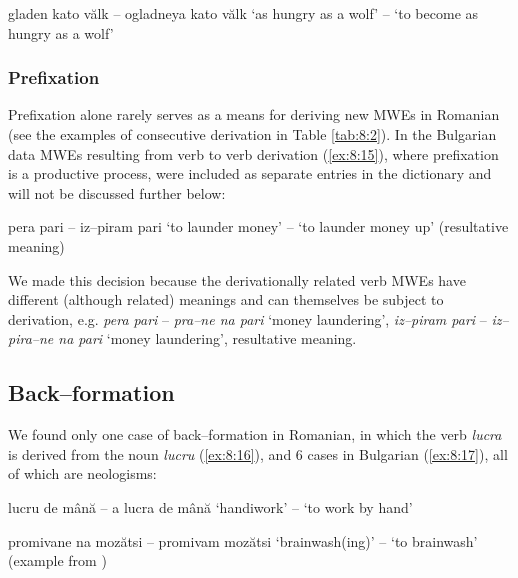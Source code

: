 \documentclass[output=paper]{langsci/langscibook}
\begin{document}
\begin{exe}
\ex \label{ex:8:14}
\settowidth{}
gladen kato vălk – ogladneya kato vălk 
 ‘as hungry as a wolf’ – ‘to become as hungry as a wolf’
\end{exe}

\subsubsection{Prefixation}
\label{prefixation}

Prefixation alone rarely serves as a means for deriving new MWEs in
Romanian (see the examples of consecutive derivation in Table \ref{tab:8:2}). In
the Bulgarian data MWEs resulting from verb to verb derivation (\ref{ex:8:15}),
where prefixation is a productive process, were included as separate
entries in the dictionary and will not be discussed further below:

\begin{exe}
\ex \label{ex:8:15}
\settowidth{}
pera pari – iz–piram pari 
‘to launder money’ – ‘to launder money up’ (resultative meaning)
\end{exe}

We made this decision because the derivationally related verb MWEs have
different (although related) meanings and can themselves be subject to
derivation, e.g. \textit{pera pari} – \textit{pra–ne na pari} `money laundering',
\textit{iz–piram pari} – \textit{iz–pira–ne na pari} `money laundering’, resultative
meaning.

\subsection{Back–formation}
\label{backformation}

We found only one case of back–formation in Romanian, in which the verb
\textit{lucra} is derived from the noun \textit{lucru} (\ref{ex:8:16}), and 6 cases in Bulgarian
(\ref{ex:8:17}), all of which are neologisms:


\begin{exe}
\ex \label{ex:8:16}
\settowidth{}
lucru de mână – a lucra de mână  
‘handiwork’ – ‘to work by hand’
\end{exe}

\begin{exe}
\ex \label{ex:8:17}
\settowidth{}
promivane na mozătsi – promivam mozătsi 
‘brainwash(ing)’ – ‘to brainwash’ (example from \citealt{blagoeva2008})
\end{exe}
\end{document}

